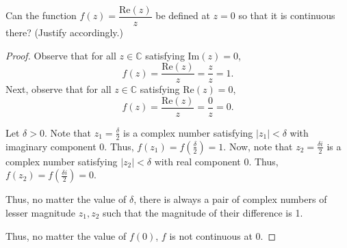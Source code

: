 \documentclass[11pt]{article}		%
\theoremstyle{definition}
\begin{document}
\newpage
{} Can the function
$
f(z) =  \dfrac{\text{Re}(z)}{z}
$
be defined at $z=0$ so that it is continuous there?  (Justify accordingly.)
\begin{proof}
    Observe that for all $z \in \mathbb C$ satisfying $\text{Im}(z) = 0$, $$f(z) = \frac{\text{Re}(z)}{z} = \frac zz = 1.$$
    Next, observe that for all $z \in \mathbb C$ satisfying $\text{Re}(z) = 0$, $$f(z) = \frac{\text{Re}(z)}{z} = \frac0z = 0.$$

    Let $\delta > 0$.
    Note that $z_1 = \frac{\delta}2$ is a complex number satisfying $|z_1| < \delta$ with imaginary component 0.
    Thus, $f(z_1) = f\left(\frac{\delta}2\right) = 1$.
    Now, note that $z_2 = \frac{\delta i}2$ is a complex number satisfying $|z_2| < \delta$ with real component 0.
    Thus, $f(z_2) = f\left(\frac{\delta i}2\right) = 0$.

    Thus, no matter the value of $\delta$, there is always a pair of complex numbers of lesser magnitude $z_1, z_2$ such that the magnitude of their difference is 1.

    Thus, no matter the value of $f(0)$, $f$ is not continuous at 0.
\end{proof}
\end{document}
